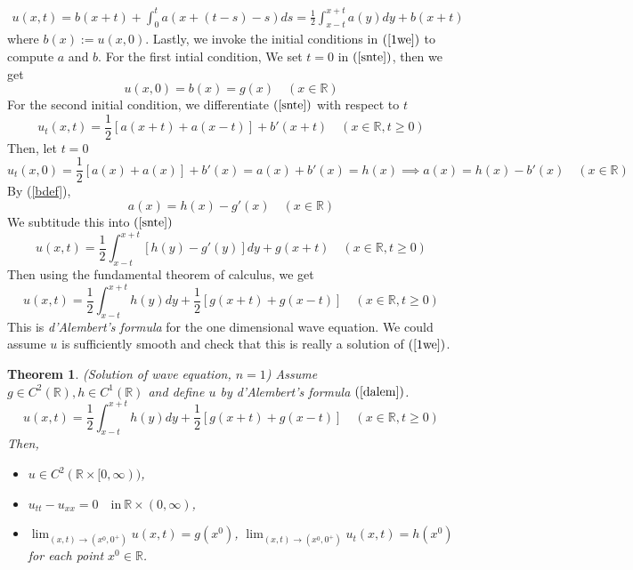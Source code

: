 \documentclass[10pt]{article}
\def\rr{{\mathbb R}}
\newtheorem{theorem}{Theorem}[section]
\begin{document}
\begin{align}
    \label{snte}
    u(x,t) = b(x+t) + \int_0^t a(x+(t-s)-s) ds = \frac{1}{2}\int_{x-t}^{x+t} a(y) dy + b(x+t) 
\end{align}
where $b(x) := u(x,0)$. Lastly, we invoke the initial conditions in $(\ref{1we})$ to compute $a$ and $b$. For the first intial condition, We set $t = 0$ in $(\ref{snte})$, then we get
\begin{equation}
    \label{bdef}
    u(x,0) = b(x) = g(x) \quad (x \in \rr)
\end{equation}
For the second initial condition, we differentiate $(\ref{snte})$ with respect to $t$
\begin{equation*}
    u_t(x,t) = \frac{1}{2}[a(x+t) + a(x-t)] + b'(x+t) \quad (x \in \rr, t \geq 0)
\end{equation*}
Then, let $t = 0$
\begin{equation*}
    u_t(x,0) = \frac{1}{2}[a(x) + a(x)] + b'(x) = a(x) + b'(x) = h(x)
    \implies a(x) = h(x) - b'(x) \quad (x \in \rr)
\end{equation*}
By (\ref{bdef}),
\begin{equation*}
    a(x) = h(x) - g'(x) \quad (x \in \rr)
\end{equation*}
We subtitude this into $(\ref{snte})$
\begin{equation*}
    u(x,t) = \frac{1}{2}\int_{x-t}^{x+t} [h(y) - g'(y)] dy + g(x+t) \quad (x \in \rr, t \geq 0)
\end{equation*}
Then using the fundamental theorem of calculus, we get
\begin{equation}
    \label{dalem}
    u(x,t) = \frac{1}{2}\int_{x-t}^{x+t} h(y) dy + \frac{1}{2}[g(x+t) + g(x-t)] \quad (x \in \rr, t \geq 0)
\end{equation}
This is \textit{d'Alembert's formula} for the one dimensional wave equation. We could assume $u$ is sufficiently smooth and check that this is really a solution of $(\ref{1we})$.
\begin{theorem}(Solution of wave equation, $n=1$)
    Assume $g\in C^2(\rr), h \in C^1(\rr)$ and define $u$ by d'Alembert's formula $(\ref{dalem})$. 
    \begin{equation*}
        u(x,t) = \frac{1}{2}\int_{x-t}^{x+t} h(y) dy + \frac{1}{2}[g(x+t) + g(x-t)] \quad (x \in \rr, t \geq 0)
    \end{equation*}
    Then,
    \begin{itemize}
        \item [(i)] $u \in C^2(\rr \times [0,\infty))$,
        \item [(ii)] $u_{tt} - u_{xx} = 0 \quad \text{in} \ \rr \times (0,\infty)$,
        \item [(iii)] $\lim_{(x,t) \to (x^0,0^+)} u(x,t) = g(x^0)$, $\lim_{(x,t) \to (x^0,0^+)} u_t(x,t) = h(x^0)$ for each point $x^0 \in \rr$.
    \end{itemize}
\end{theorem}
\end{document}
